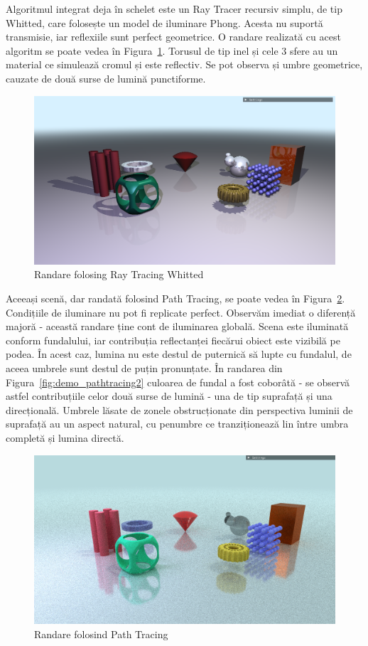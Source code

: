 \documentclass[12pt,a4paper]{report}
\numberwithin{equation}{section} %
\begin{document}
Algoritmul integrat deja în schelet este un Ray Tracer recursiv simplu, de tip Whitted,
care folosește un model de iluminare Phong. Acesta nu suportă transmisie, iar
reflexiile sunt perfect geometrice. O randare realizată cu acest algoritm se poate
vedea în Figura~\ref{fig:demo_whitted}. Torusul de tip inel și cele 3 sfere
au un material ce simulează cromul și este reflectiv. Se pot observa și umbre
geometrice, cauzate de două surse de lumină punctiforme.
\begin{figure}[ht]
	\centering
	\includegraphics[width=\textwidth]{pics/demo_whitted.png}
	\caption{Randare folosing Ray Tracing Whitted}
	\label{fig:demo_whitted}
\end{figure}
Aceeași scenă, dar randată folosind Path Tracing, se poate vedea în Figura~\ref{fig:demo_pathtracing}.
Condițiile de iluminare nu pot fi replicate perfect. Observăm imediat o diferență
majoră - această randare ține cont de iluminarea globală. Scena este iluminată
conform fundalului, iar contribuția reflectanței fiecărui obiect este vizibilă
pe podea. În acest caz, lumina nu este destul de puternică să lupte cu fundalul,
de aceea umbrele sunt destul de puțin pronunțate. În randarea din Figura~\ref{fig:demo_pathtracing2}
culoarea de fundal a fost coborâtă - se observă astfel contribuțiile celor două surse
de lumină - una de tip suprafață și una direcțională. Umbrele lăsate de zonele
obstrucționate din perspectiva luminii de suprafață au un aspect natural, cu penumbre
ce tranziționează lin între umbra completă și lumina directă.
\begin{figure}[!htb]
	\centering
	\includegraphics[width=\textwidth]{pics/demo_pathtracing.png}
	\caption{Randare folosind Path Tracing}
	\label{fig:demo_pathtracing}
\end{figure}
\end{document}
